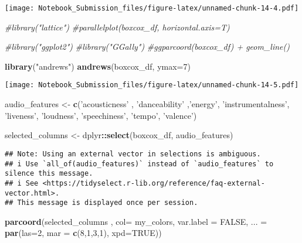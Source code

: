 \documentclass[
]{article}
\newenvironment{Shaded}{\begin{snugshade}}{\end{snugshade}}
\newcommand{\CommentTok}[1]{\textcolor[rgb]{0.56,0.35,0.01}{\textit{#1}}}
\newcommand{\DataTypeTok}[1]{\textcolor[rgb]{0.13,0.29,0.53}{#1}}
\newcommand{\DecValTok}[1]{\textcolor[rgb]{0.00,0.00,0.81}{#1}}
\newcommand{\KeywordTok}[1]{\textcolor[rgb]{0.13,0.29,0.53}{\textbf{#1}}}
\newcommand{\NormalTok}[1]{#1}
\newcommand{\OperatorTok}[1]{\textcolor[rgb]{0.81,0.36,0.00}{\textbf{#1}}}
\newcommand{\OtherTok}[1]{\textcolor[rgb]{0.56,0.35,0.01}{#1}}
\newcommand{\StringTok}[1]{\textcolor[rgb]{0.31,0.60,0.02}{#1}}
\begin{document}
\texttt{[image: Notebook\_Submission\_files/figure-latex/unnamed-chunk-14-4.pdf]}

\begin{Shaded}
\begin{Highlighting}[]
\CommentTok{#library("lattice")}
\CommentTok{#parallelplot(boxcox_df, horizontal.axis=T)}

\CommentTok{#library("ggplot2")}
\CommentTok{#library("GGally")}
\CommentTok{#ggparcoord(boxcox_df) + geom_line()}

\KeywordTok{library}\NormalTok{(}\StringTok{"andrews"}\NormalTok{)}
\KeywordTok{andrews}\NormalTok{(boxcox_df, }\DataTypeTok{ymax=}\DecValTok{7}\NormalTok{)}
\end{Highlighting}
\end{Shaded}

\texttt{[image: Notebook\_Submission\_files/figure-latex/unnamed-chunk-14-5.pdf]}

\begin{Shaded}
\begin{Highlighting}[]
\NormalTok{audio_features <-}\StringTok{ }\KeywordTok{c}\NormalTok{(}\StringTok{'acousticness'}\NormalTok{ , }\StringTok{'danceability'}\NormalTok{ ,}\StringTok{'energy'}\NormalTok{, }\StringTok{'instrumentalness'}\NormalTok{, }\StringTok{'liveness'}\NormalTok{, }\StringTok{'loudness'}\NormalTok{, }\StringTok{'speechiness'}\NormalTok{, }\StringTok{'tempo'}\NormalTok{, }\StringTok{'valence'}\NormalTok{)}

\NormalTok{selected_columns <-}\StringTok{ }\NormalTok{dplyr}\OperatorTok{::}\KeywordTok{select}\NormalTok{(boxcox_df, audio_features)}
\end{Highlighting}
\end{Shaded}

\begin{verbatim}
## Note: Using an external vector in selections is ambiguous.
## i Use `all_of(audio_features)` instead of `audio_features` to silence this message.
## i See <https://tidyselect.r-lib.org/reference/faq-external-vector.html>.
## This message is displayed once per session.
\end{verbatim}

\begin{Shaded}
\begin{Highlighting}[]
\KeywordTok{parcoord}\NormalTok{(selected_columns , }\DataTypeTok{col=}\NormalTok{ my_colors, }\DataTypeTok{var.label =} \OtherTok{FALSE}\NormalTok{, }\DataTypeTok{... =} \KeywordTok{par}\NormalTok{(}\DataTypeTok{las=}\DecValTok{2}\NormalTok{, }\DataTypeTok{mar =} \KeywordTok{c}\NormalTok{(}\DecValTok{8}\NormalTok{,}\DecValTok{1}\NormalTok{,}\DecValTok{3}\NormalTok{,}\DecValTok{1}\NormalTok{), }\DataTypeTok{xpd=}\OtherTok{TRUE}\NormalTok{))}
\end{Highlighting}
\end{Shaded}
\end{document}
